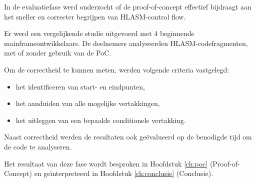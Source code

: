In de evaluatiefase werd onderzocht of de proof-of-concept effectief bijdraagt aan het sneller en correcter begrijpen van HLASM-control flow. 

Er werd een vergelijkende studie uitgevoerd met 4 beginnende mainframeontwikkelaars. De deelnemers analyseerden HLASM-codefragmenten, met of zonder gebruik van de PoC.

Om de correctheid te kunnen meten, werden volgende criteria vastgelegd:

\begin{itemize}
    \item het identificeren van start- en eindpunten,
    \item het aanduiden van alle mogelijke vertakkingen,
    \item het uitleggen van een bepaalde conditionele vertakking.
\end{itemize}

Naast correctheid werden de resultaten ook geëvalueerd op de benodigde tijd om de code te analyseren. 

Het resultaat van deze fase wordt besproken in Hoofdstuk \ref{ch:poc} (Proof-of-Concept) en geïnterpreteerd in Hoofdstuk \ref{ch:conclusie} (Conclusie).


